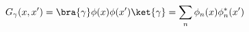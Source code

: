 \begin{equation}
G_{\gamma}(x,x')=\bra{\gamma}
\phi(x)\phi(x')\ket{\gamma}=
\sum_n
\phi_n(x)
\phi^*_n(x')
\end{equation}

